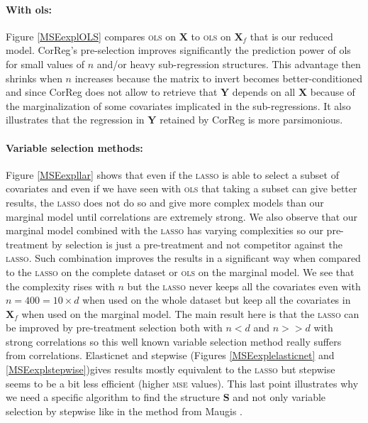 \documentclass[12pt,a4paper]{report}
\begin{document}
\paragraph{With {\sc ols}:} Figure \ref{MSEexplOLS} %
	compares \textsc{ols} on $\boldsymbol{X}$ to \textsc{ols} on $\boldsymbol{X}_f$ that is our reduced model. 
{\sc CorReg}'s pre-selection improves significantly the prediction power of {\sc ols} for small values of $n$ and/or heavy sub-regression structures. This advantage then shrinks when $n$ increases because the matrix to invert becomes better-conditioned and since {\sc CorReg} does not allow to retrieve that $\boldsymbol{Y}$ depends on all $\boldsymbol{X}$ because of the marginalization of some covariates implicated in the sub-regressions. It also illustrates that the regression in $\boldsymbol{Y}$ retained by {\sc CorReg} is more parsimonious.%

\paragraph{Variable selection methods:} Figure \ref{MSEexpllar} shows that even if the \textsc{lasso} is able to select a subset of covariates and even if we have seen with \textsc{ols} that taking a subset can give better results, the \textsc{lasso} does not do so and give more complex models than our marginal model until correlations are extremely strong. We also observe that our marginal model combined with the \textsc{lasso} has varying complexities so our pre-treatment by selection is just a pre-treatment and not competitor against the \textsc{lasso}. Such combination improves the results in a significant way when compared to the \textsc{lasso} on the complete dataset or \textsc{ols} on the marginal model. We see that the complexity rises with $n$ but the \textsc{lasso} never keeps all the covariates even with $n=400=10\times d$ when used on the whole dataset but keep all the covariates in $\boldsymbol{X}_f$ when used on the marginal model. The main result here is that the \textsc{lasso} can be improved by pre-treatment selection both with $n<d$ and $n>>d$ with strong correlations so this well known variable selection method really suffers from correlations. Elasticnet and stepwise (Figures \ref{MSEexplelasticnet} and \ref{MSEexplstepwise})gives results mostly equivalent to the \textsc{lasso} but stepwise seems to be a bit less efficient (higher \textsc{mse} values). This last point illustrates why we need a specific algorithm to find the structure $\boldsymbol{S}$ and not only variable selection by stepwise like in the method from Maugis \cite{maugis2009variable}. \\
\end{document}
